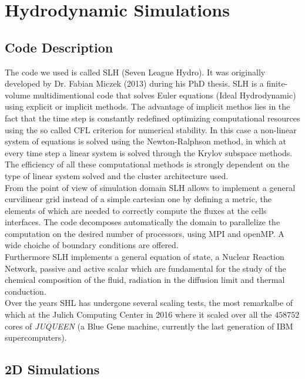 
\section{Hydrodynamic Simulations}
\subsection{Code Description}

The code we used is called SLH (Seven League Hydro). It was originally developed by Dr. Fabian Miczek (2013) during his PhD thesis. SLH is a finite-volume multidimentional code that solves Euler equations (Ideal Hydrodynamic) using explicit or implicit methods. The advantage of implicit methos lies in the fact that the time step is constantly redefined optimizing computational resources using the so called CFL criterion for numerical stability. In this case a non-linear system of equations is solved using the Newton-Ralphson method, in which at every time step a linear system is solved through the Krylov subspace methods. The efficiency of all these computational methods is strongly dependent on the type of linear system solved and the cluster architecture used. \\
From the point of view of simulation domain SLH allows to implement a general curvilinear grid instead of a simple cartesian one by defining a metric, the elements of which are needed to correctly compute the fluxes at the cells interfaces. The code decomposes automatically the domain to parallelize the computation on the desired number of processors, using MPI and openMP. A wide choiche of boundary conditions are offered. \\
Furthermore SLH implements a general equation of state, a Nuclear Reaction Network, passive and active scalar which are fundamental for the study of the chemical composition of the fluid, radiation in the diffusion limit and thermal conduction. \\
Over the years SHL has undergone several scaling tests, the most remarkalbe of which at the Julich Computing Center in 2016 where it scaled over all the $458752$ cores of \textit{JUQUEEN} (a Blue Gene machine, currently the last generation of IBM supercomputers).
\subsection{2D Simulations}

